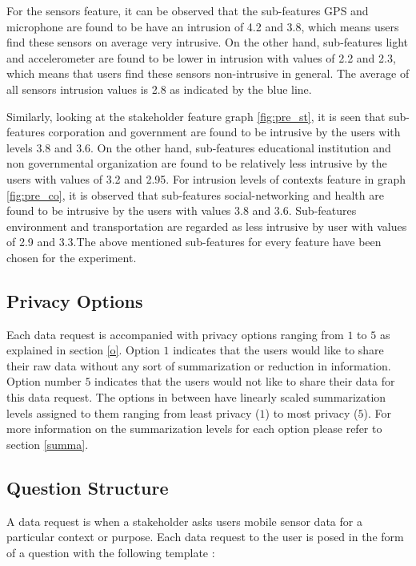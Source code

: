 For the sensors feature, it can be observed that the sub-features GPS and microphone are found to be have an intrusion of 4.2 and 3.8, which means users find these sensors on average very intrusive. On the other hand, sub-features light and accelerometer are found to be lower in intrusion with values of 2.2 and 2.3, which means that users find these sensors non-intrusive in general. The average of all sensors intrusion values is 2.8 as indicated by the blue line.

Similarly, looking at the stakeholder feature graph \ref{fig:pre_st}, it is seen that sub-features  corporation and government are found to be intrusive by the users with levels 3.8 and 3.6. On the other hand, sub-features educational institution and non governmental organization are found to be relatively less intrusive by the users with values of 3.2 and 2.95. For intrusion levels of contexts feature in graph \ref{fig:pre_co}, it is observed that sub-features social-networking and health are found to be intrusive by the users with values 3.8 and 3.6. Sub-features environment and
transportation are regarded as less intrusive by user with values of 2.9 and 3.3.The above mentioned sub-features for every feature have been chosen for the experiment.


\subsection{Privacy Options} \label{options}

Each data request is accompanied with privacy options ranging from $1$ to $5$ as explained in section \ref{o}. Option $1$ indicates that the users would like to
share their raw data without any sort of summarization or reduction in information. Option number $5$ indicates that the users would not like to share their data for this data request.
The options in between have linearly scaled summarization levels assigned to them ranging from least privacy ($1$) to most privacy ($5$). For more information on the summarization levels for each option please refer to section \ref{summa}. 

\subsection{Question Structure}

A data request is when a stakeholder asks users mobile sensor data for a particular context or purpose. Each data request to the user is posed in the form of a question with the following template :

